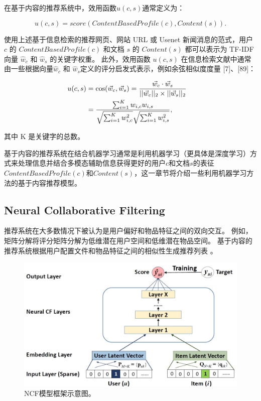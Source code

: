 \documentclass[sigconf]{acmart}
\begin{document}
在基于内容的推荐系统中，效用函数$u(c,s)$通常定义为：

\begin{equation}
  u(c, s) = score(ContentBasedProfile(c), Content(s)).
\end{equation}

使用上述基于信息检索的推荐网页、网站 URL 或 Usenet 新闻消息的范式，用户 $c$ 的 $ContentBasedProfile(c)$ 和文档 $s$ 的 $Content(s)$ 都可以表示为 TF-IDF 向量 $\hat{w}_c$ 和 $\hat{w}_s$ 的关键字权重。 此外，效用函数 $u(c,s)$ 在信息检索文献中通常由一些根据向量$\hat{w}_c$ 和 $\hat{w}_s$定义的评分启发式表示，例如余弦相似度度量 [7]、[89]：

\begin{equation}
  \begin{aligned}
    u(c, s) &= \cos (\vec w_c, \vec w_s) = {{\vec w_c \cdot \vec w_s } \over {||\vec w_c ||_2 \times ||\vec w_s ||_2 }}\cr& = {{\sum\nolimits_{i = 1}^K {w_{i, c} w_{i, s} } } \over {\sqrt {\sum\nolimits_{i = 1}^K {w_{i, c}^2 } } \sqrt {\sum\nolimits_{i = 1}^K {w_{i, s}^2 } }}},
  \end{aligned}
\end{equation}

其中 K 是关键字的总数。

基于内容的推荐系统在结合机器学习通常是利用机器学习（更具体是深度学习）方式来处理信息并结合多模态辅助信息获得更好的用户$c$和文档$s$的表征$ContentBasedProfile(c)$和$Content(s)$，这一章节将介绍一些利用机器学习方法的基于内容推荐模型。

\subsection{Neural Collaborative Filtering} 

推荐系统在大多数情况下被认为是用户偏好和物品特征之间的双向交互。 例如，矩阵分解将评分矩阵分解为低维潜在用户空间和低维潜在物品空间。 基于内容的推荐系统根据用户配置文件和物品特征之间的相似性生成推荐列表 \cite{lops2011content}。

\begin{figure}[t]
  \centering
  \includegraphics[width=\linewidth]{./img/ncf.jpg}
  \caption{NCF模型框架示意图。}
  \label{fig:ncf}
\end{figure}  
\end{document}
